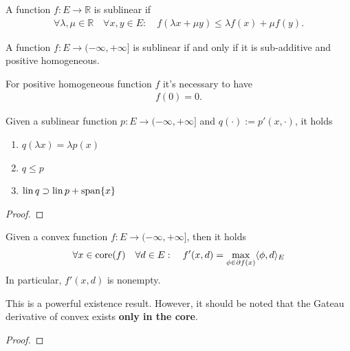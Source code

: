\begin{definition}
	A function $f:E \rightarrow \mathbb{R}$ is sublinear if 
	\begin{align*}
		\forall \lambda, \mu \in \mathbb{R} \quad \forall x, y \in E : \quad f(\lambda x + \mu y) \le \lambda f(x) + \mu f(y). 
	\end{align*}
\end{definition}

\begin{proposition}
	A function $f: E \rightarrow (-\infty, +\infty]$ is sublinear if and only if it is sub-additive and positive homogeneous.  
\end{proposition}
\begin{remark}
For positive homogeneous function $f$ it's necessary to have
\begin{align*}
	f(0) = 0. 
\end{align*}	
\end{remark}



\begin{lemma}
	Given a sublinear function $p: E \rightarrow (-\infty, + \infty]$ and $q(\cdot):= p'(x, \cdot)$,  it holds
	\begin{enumerate}
		\item $q(\lambda x ) = \lambda p(x)$
		\item $q \le p$ 
		\item $\operatorname*{lin} q \supset \operatorname*{lin} p + \operatorname*{span}\{x\}$ 
	\end{enumerate}
\end{lemma}
\begin{proof}
\end{proof}

\begin{theorem}
	Given a convex function $f: E \rightarrow (-\infty, +\infty]$, then it holds
	\begin{equation}
		\forall x \in \operatorname*{core}(f) \quad \forall d \in E: \quad f'(x, d) = \max_{\phi \in \partial f(x) } \langle \phi, d \rangle_E
	\end{equation} 
	In particular, $f'(x, d)$ is nonempty. 
\end{theorem}
\begin{remark}
This is a powerful existence result. However, it should be noted that the Gateau derivative of convex exists \textbf{only in the core}.	
\end{remark}
\begin{proof}
\end{proof}

